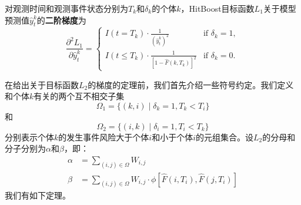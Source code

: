 \begin{theorem}\label{thm:1.2}
对观测时间和观测事件状态分别为$T_k$和$\delta_k$的个体$k$，HitBoost目标函数$L_1$关于模型预测值$\hat{y}_t^k$的\textbf{二阶梯度}为$$
\frac{\partial^2 L_1}{\partial \hat{y}_t^k}=
\begin{cases}
I(t=T_k)\cdot \frac{1}{{(\hat{y}_t^k)}^2} & \text{if } \delta_k = 1,\\
I(t\le T_k)\cdot \frac{1}{{[1-\hat{F}(k, T_k)]}^2} & \text{if } \delta_k = 0.
\end{cases}
$$
\end{theorem}

在给出关于目标函数$L_2$的梯度的定理前，我们首先介绍一些符号约定。我们定义和个体$k$有关的两个互不相交子集\begin{equation}
\Omega_1=\{(k,i) \mid \delta_k=1,T_k < T_i\}
\end{equation}
和
\begin{equation}
\Omega_2=\{(i,k) \mid \delta_i=1,T_i < T_k\}
\end{equation}
分别表示个体$k$的发生事件风险大于个体$i$和小于个体$i$的元组集合。设$L_2$的分母和分子分别为$\alpha$和$\beta$，即：
\begin{equation}
\begin{split}
\alpha &= \sum_{(i,j)\in \Omega} W_{i,j}\\
\beta &= \sum_{(i,j)\in \Omega} W_{i,j} \cdot \phi\left[ \hat{F}(i, T_i), \hat{F}(j, T_i) \right]
\end{split}
\end{equation}
我们有如下定理。

